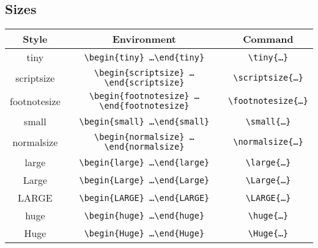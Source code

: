 \subsection*{Sizes}

\begin{small}
\begin{center}
  \begin{tabular}{c c c}
    \hline
    Style               & Environment                                                                 & Command \\
    \hline
    \tiny{tiny}         & \texttt{\textbackslash begin\{tiny\} \ldots \textbackslash end\{tiny\}}      & \texttt{\textbackslash tiny\{\ldots\}}\\
    \scriptsize{scriptsize} & \texttt{\textbackslash begin\{scriptsize\} \ldots \textbackslash end\{scriptsize\}}      & \texttt{\textbackslash scriptsize\{\ldots\}}\\
    \footnotesize{footnotesize} & \texttt{\textbackslash begin\{footnotesize\} \ldots \textbackslash end\{footnotesize\}}      & \texttt{\textbackslash footnotesize\{\ldots\}}\\
    \small{small} & \texttt{\textbackslash begin\{small\} \ldots \textbackslash end\{small\}}      & \texttt{\textbackslash small\{\ldots\}}\\
    \normalsize{normalsize} & \texttt{\textbackslash begin\{normalsize\} \ldots \textbackslash end\{normalsize\}}      & \texttt{\textbackslash normalsize\{\ldots\}}\\
    \large{large} & \texttt{\textbackslash begin\{large\} \ldots \textbackslash end\{large\}}      & \texttt{\textbackslash large\{\ldots\}}\\
    \Large{Large} & \texttt{\textbackslash begin\{Large\} \ldots \textbackslash end\{Large\}}      & \texttt{\textbackslash Large\{\ldots\}}\\
    \LARGE{LARGE} & \texttt{\textbackslash begin\{LARGE\} \ldots \textbackslash end\{LARGE\}}      & \texttt{\textbackslash LARGE\{\ldots\}}\\
    \huge{huge} & \texttt{\textbackslash begin\{huge\} \ldots \textbackslash end\{huge\}}      & \texttt{\textbackslash huge\{\ldots\}}\\
    \Huge{Huge} & \texttt{\textbackslash begin\{Huge\} \ldots \textbackslash end\{Huge\}}      & \texttt{\textbackslash Huge\{\ldots\}}\\
    \hline
  \end{tabular}
\end{center}
\end{small}

